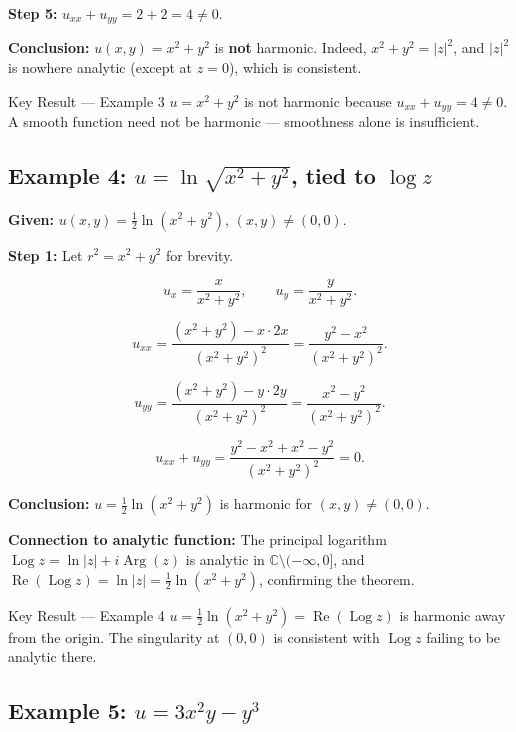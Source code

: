 \documentclass[12pt,a4paper]{article}
\begin{document}
\textbf{Step 5:} $u_{xx}+u_{yy} = 2+2 = 4 \neq 0$.

\textbf{Conclusion:} $u(x,y)=x^{2}+y^{2}$ is \textbf{not} harmonic. Indeed, $x^{2}+y^{2}=|z|^{2}$,
and $|z|^{2}$ is nowhere analytic (except at $z=0$), which is consistent.

\begin{learnbox}{Key Result --- Example 3}
$u=x^{2}+y^{2}$ is not harmonic because $u_{xx}+u_{yy}=4\neq 0$. A smooth function need not
be harmonic --- smoothness alone is insufficient.
\end{learnbox}

\subsection*{Example 4: $u = \ln\!\sqrt{x^{2}+y^{2}}$, tied to $\log z$}

\textbf{Given:} $u(x,y)=\tfrac{1}{2}\ln(x^{2}+y^{2})$, $(x,y)\neq(0,0)$.

\textbf{Step 1:} Let $r^{2}=x^{2}+y^{2}$ for brevity.

\[
  u_{x} = \frac{x}{x^{2}+y^{2}}, \qquad u_{y} = \frac{y}{x^{2}+y^{2}}.
\]

\[
  u_{xx} = \frac{(x^{2}+y^{2})-x\cdot 2x}{(x^{2}+y^{2})^{2}}
         = \frac{y^{2}-x^{2}}{(x^{2}+y^{2})^{2}}.
\]

\[
  u_{yy} = \frac{(x^{2}+y^{2})-y\cdot 2y}{(x^{2}+y^{2})^{2}}
         = \frac{x^{2}-y^{2}}{(x^{2}+y^{2})^{2}}.
\]

\[
  u_{xx}+u_{yy} = \frac{y^{2}-x^{2}+x^{2}-y^{2}}{(x^{2}+y^{2})^{2}} = 0.
\]

\textbf{Conclusion:} $u=\frac{1}{2}\ln(x^{2}+y^{2})$ is harmonic for $(x,y)\neq(0,0)$.

\textbf{Connection to analytic function:} The principal logarithm $\operatorname{Log}z =
\ln|z|+i\operatorname{Arg}(z)$ is analytic in $\mathbb{C}\setminus(-\infty,0]$, and
$\operatorname{Re}(\operatorname{Log}z)=\ln|z|=\frac{1}{2}\ln(x^{2}+y^{2})$, confirming the theorem.

\begin{learnbox}{Key Result --- Example 4}
$u=\tfrac{1}{2}\ln(x^{2}+y^{2})=\operatorname{Re}(\operatorname{Log}z)$ is harmonic away from
the origin. The singularity at $(0,0)$ is consistent with $\operatorname{Log}z$ failing to be
analytic there.
\end{learnbox}

\subsection*{Example 5: $u = 3x^{2}y - y^{3}$}
\end{document}
